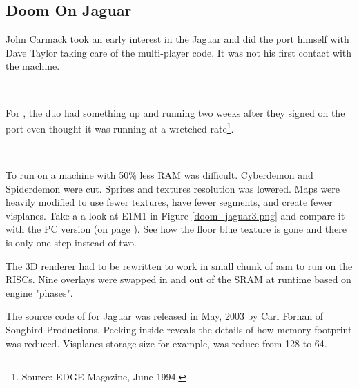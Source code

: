 \subsection{Doom On Jaguar}
John Carmack took an early interest in the Jaguar and did the port himself with Dave Taylor taking care of the multi-player code. It was not his first contact with the machine.\\
\par
{}\\
\par
For \doom, the duo had something up and running two weeks after they signed on the port even thought it was running at a wretched rate\footnote{Source: EDGE Magazine, June 1994.}.\\
\par
{}\\
\par
To run on a machine with 50\% less RAM was difficult. Cyberdemon and Spiderdemon were cut. Sprites and textures resolution was lowered. Maps were heavily modified to use fewer textures, have fewer segments, and create fewer visplanes. Take a a look at E1M1 in Figure \ref{doom_jaguar3.png} and compare it with the PC version (on page \pageref{mashed_potatoes1.png}). See how  the floor blue texture is gone and there is only one step instead of two.\\
\par
The 3D renderer had to be rewritten to work in small chunk of asm to run on the RISCs. Nine overlays were swapped in and out of the SRAM at runtime based on engine "phases".\\
\par
{}
\par
The source code of \doom for Jaguar was released in May, 2003 by Carl Forhan of Songbird Productions. Peeking inside reveals the details of how memory footprint was reduced. Visplanes storage size for example, was reduce from 128 to 64.\\
